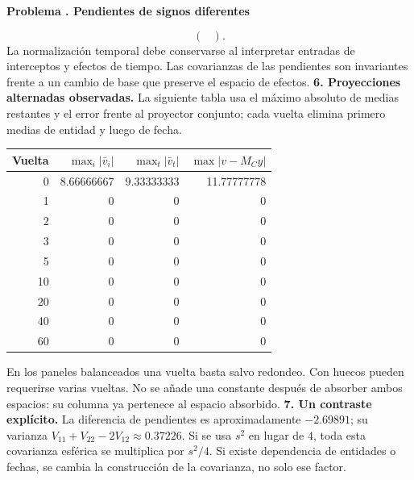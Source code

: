 \documentclass[11pt,a4paper]{article}
\theoremstyle{definition}
\newcounter{problema}
\newenvironment{resuelto}[1]{\refstepcounter{problema}\par\medskip\Needspace{6\baselineskip}\textbf{Problema \theproblema. #1}\par}{\par\medskip}
\begin{document}
\begin{resuelto}{Pendientes de signos diferentes}
{\[\begin{pmatrix}
\end{pmatrix}.
\]
}
La normalización temporal debe conservarse al interpretar entradas de interceptos y efectos de tiempo. Las covarianzas de las pendientes son invariantes frente a un cambio de base que preserve el espacio de efectos.
\textbf{6. Proyecciones alternadas observadas.} La siguiente tabla usa el máximo absoluto de medias restantes y el error frente al proyector conjunto; cada vuelta elimina primero medias de entidad y luego de fecha.

\begin{center}\small
\begin{tabular}{rrrr}
\toprule
Vuelta&$\max_i|\bar v_i|$&$\max_t|\bar v_t|$&$\max|v-M_Cy|$\\
\midrule
0&8.66666667&9.33333333&11.77777778\\
1&0&0&0\\
2&0&0&0\\
3&0&0&0\\
5&0&0&0\\
10&0&0&0\\
20&0&0&0\\
40&0&0&0\\
60&0&0&0\\
\bottomrule
\end{tabular}
\end{center}
En los paneles balanceados una vuelta basta salvo redondeo. Con huecos pueden requerirse varias vueltas. No se añade una constante después de absorber ambos espacios: su columna ya pertenece al espacio absorbido.
\textbf{7. Un contraste explícito.} La diferencia de pendientes es aproximadamente $-2.69891$; su varianza $V_{11}+V_{22}-2V_{12}\approx0.37226$. Si se usa $s^2$ en lugar de $4$, toda esta covarianza esférica se multiplica por $s^2/4$. Si existe dependencia de entidades o fechas, se cambia la construcción de la covarianza, no solo ese factor.
\end{resuelto}
\end{document}
